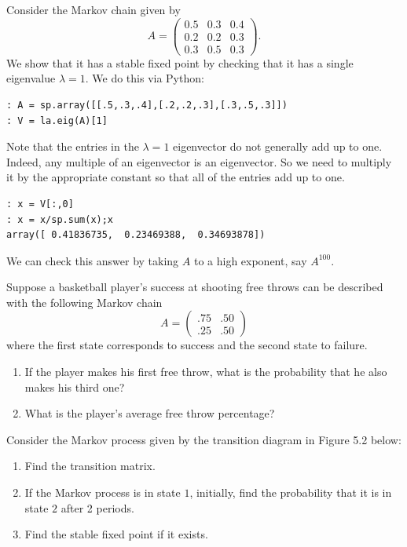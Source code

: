 Consider the Markov chain given by
\[
A = \begin{pmatrix}
0.5 & 0.3 & 0.4\\
0.2 & 0.2 & 0.3\\
0.3 & 0.5 & 0.3
\end{pmatrix}.
\]
We show that it has a stable fixed point by checking that it has a single eigenvalue $\lambda=1$.  We do this via Python:
\begin{lstlisting}[style=python]
: A = sp.array([[.5,.3,.4],[.2,.2,.3],[.3,.5,.3]])
: V = la.eig(A)[1]
\end{lstlisting}
Note that the entries in the $\lambda=1$ eigenvector do not generally add up to one.  Indeed, any multiple of an eigenvector is an eigenvector.  So we need to multiply it by the appropriate constant so that all of the entries add up to one.
\begin{lstlisting}[style=python]
: x = V[:,0]
: x = x/sp.sum(x);x
array([ 0.41836735,  0.23469388,  0.34693878])
\end{lstlisting}
We can check this answer by taking $A$ to a high exponent, say $A^{100}$.

\begin{problem}
Suppose a basketball player's success at shooting free throws can be
described with the following Markov chain
\[
A = \begin{pmatrix}.75&.50\\.25&.50\end{pmatrix}
\]
where the first state corresponds to success and the second state to failure.
\begin{enumerate}
\item If the player makes his first free throw, what is the probability that he also makes his third one?
\item What is the player's average free throw percentage?
\end{enumerate}
\end{problem}

\begin{problem}
Consider the Markov process given by the transition diagram in Figure 5.2 below:
\begin{enumerate}
\item Find the transition matrix.
\item If the Markov process is in state $1$, initially, find the probability that it is in state $2$ after 2 periods.
\item Find the stable fixed point if it exists.
\end{enumerate}
\end{problem}

